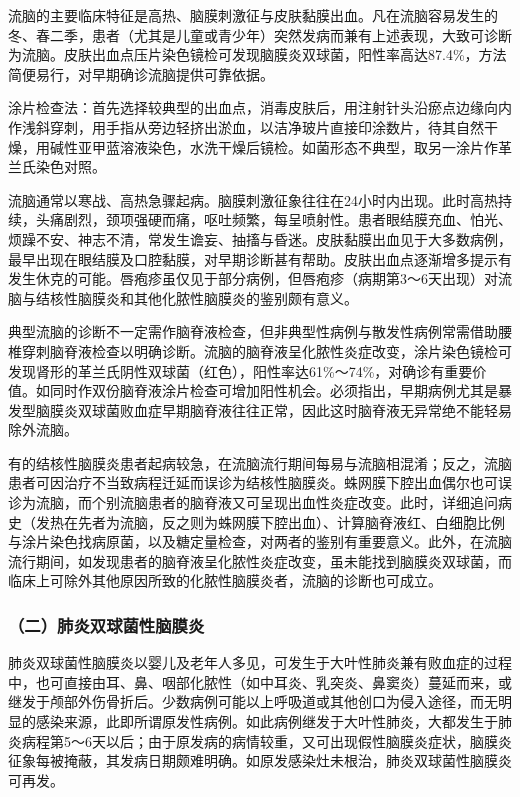 流脑的主要临床特征是高热、脑膜刺激征与皮肤黏膜出血。凡在流脑容易发生的冬、春二季，患者（尤其是儿童或青少年）突然发病而兼有上述表现，大致可诊断为流脑。皮肤出血点压片染色镜检可发现脑膜炎双球菌，阳性率高达87.4\%，方法简便易行，对早期确诊流脑提供可靠依据。

涂片检查法：首先选择较典型的出血点，消毒皮肤后，用注射针头沿瘀点边缘向内作浅斜穿刺，用手指从旁边轻挤出淤血，以洁净玻片直接印涂数片，待其自然干燥，用碱性亚甲蓝溶液染色，水洗干燥后镜检。如菌形态不典型，取另一涂片作革兰氏染色对照。

流脑通常以寒战、高热急骤起病。脑膜刺激征象往往在24小时内出现。此时高热持续，头痛剧烈，颈项强硬而痛，呕吐频繁，每呈喷射性。患者眼结膜充血、怕光、烦躁不安、神志不清，常发生谵妄、抽搐与昏迷。皮肤黏膜出血见于大多数病例，最早出现在眼结膜及口腔黏膜，对早期诊断甚有帮助。皮肤出血点逐渐增多提示有发生休克的可能。唇疱疹虽仅见于部分病例，但唇疱疹（病期第3～6天出现）对流脑与结核性脑膜炎和其他化脓性脑膜炎的鉴别颇有意义。

典型流脑的诊断不一定需作脑脊液检查，但非典型性病例与散发性病例常需借助腰椎穿刺脑脊液检查以明确诊断。流脑的脑脊液呈化脓性炎症改变，涂片染色镜检可发现肾形的革兰氏阴性双球菌（红色），阳性率达61\%～74\%，对确诊有重要价值。如同时作双份脑脊液涂片检查可增加阳性机会。必须指出，早期病例尤其是暴发型脑膜炎双球菌败血症早期脑脊液往往正常，因此这时脑脊液无异常绝不能轻易除外流脑。

有的结核性脑膜炎患者起病较急，在流脑流行期间每易与流脑相混淆；反之，流脑患者可因治疗不当致病程迁延而误诊为结核性脑膜炎。蛛网膜下腔出血偶尔也可误诊为流脑，而个别流脑患者的脑脊液又可呈现出血性炎症改变。此时，详细追问病史（发热在先者为流脑，反之则为蛛网膜下腔出血）、计算脑脊液红、白细胞比例与涂片染色找病原菌，以及糖定量检查，对两者的鉴别有重要意义。此外，在流脑流行期间，如发现患者的脑脊液呈化脓性炎症改变，虽未能找到脑膜炎双球菌，而临床上可除外其他原因所致的化脓性脑膜炎者，流脑的诊断也可成立。

\subsubsection{（二）肺炎双球菌性脑膜炎}

肺炎双球菌性脑膜炎以婴儿及老年人多见，可发生于大叶性肺炎兼有败血症的过程中，也可直接由耳、鼻、咽部化脓性（如中耳炎、乳突炎、鼻窦炎）蔓延而来，或继发于颅部外伤骨折后。少数病例可能以上呼吸道或其他创口为侵入途径，而无明显的感染来源，此即所谓原发性病例。如此病例继发于大叶性肺炎，大都发生于肺炎病程第5～6天以后；由于原发病的病情较重，又可出现假性脑膜炎症状，脑膜炎征象每被掩蔽，其发病日期颇难明确。如原发感染灶未根治，肺炎双球菌性脑膜炎可再发。

